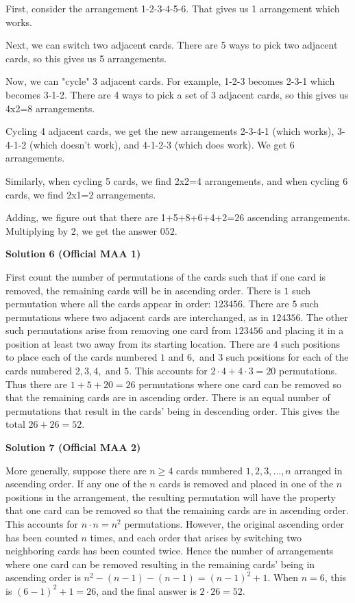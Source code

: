\begin{enumerate}
 First, consider the arrangement 1-2-3-4-5-6. That gives us 1 arrangement which works. 

 Next, we can switch two adjacent cards. There are 5 ways to pick two adjacent cards, so this gives us 5 arrangements.

 Now, we can "cycle" 3 adjacent cards. For example, 1-2-3 becomes 2-3-1 which becomes 3-1-2. There are 4 ways to pick a set of 3 adjacent cards, so this gives us 4x2=8 arrangements.

 Cycling 4 adjacent cards, we get the new arrangements 2-3-4-1 (which works), 3-4-1-2 (which doesn't work), and 4-1-2-3 (which does work). We get 6 arrangements.

 Similarly, when cycling 5 cards, we find 2x2=4 arrangements, and when cycling 6 cards, we find 2x1=2 arrangements.

 Adding, we figure out that there are 1+5+8+6+4+2=26 ascending arrangements. Multiplying by 2, we get the answer $\boxed{052}.$




\textbf{Solution 6 (Official MAA 1)}

First count the number of permutations of the cards such that if one card is removed, the remaining cards will be in ascending order. There is $1$ such permutation where all the cards appear in order: $123456.$ There are $5$ such permutations where two adjacent cards are interchanged, as in $124356.$ The other such permutations arise from removing one card from $123456$ and placing it in a position at least two away from its starting location. There are $4$ such positions to place each of the cards numbered $1$ and $6,$ and $3$ such positions for each of the cards numbered $2, 3, 4,$ and $5.$ This accounts for $2\cdot4 + 4\cdot3 =20$ permutations. Thus there are $1 + 5 + 20 = 26$ permutations where one card can be removed so that the remaining cards are in ascending order. There is an equal number of permutations that result in the cards' being in descending order. This gives the total $26 + 26 = \boxed{52}$.

 



\textbf{Solution 7 (Official MAA 2)}

More generally, suppose there are $n \geq 4$ cards numbered $1, 2, 3, \dots, n$ arranged in ascending order. If any one of the $n$ cards is removed and placed in one of the $n$ positions in the arrangement, the resulting permutation will have the property that one card can be removed so that the remaining cards are in ascending order. This accounts for $n\cdot n = n^2$ permutations. However, the original ascending order has been counted $n$ times, and each order that arises by switching two neighboring cards has been counted twice. Hence the number of arrangements where one card can be removed resulting in the remaining cards' being in ascending order is $n^2-(n-1)-(n-1)=(n-1)^2+1.$ When $n = 6$, this is $(6-1)^2+1 = 26$, and the final answer is $2\cdot26 = \boxed{52}$.


\end{enumerate}
